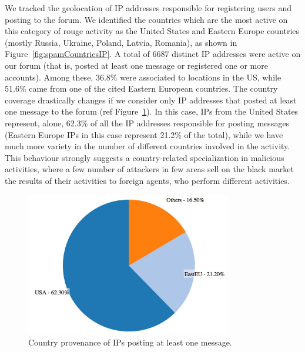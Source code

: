 We tracked the geolocation of IP addresses responsible for registering users and posting to the forum. We identified the countries which are the most active on this category of rouge activity as the United States and Eastern Europe countries (mostly Russia, Ukraine, Poland, Latvia, Romania), as shown in Figure~\ref{fig:spamCountriesIP}. A total of 6687 distinct IP addresses were active on our forum (that is, posted at least one message or registered one or more accounts). Among these, 36.8\% were associated to locations in the US, while 51.6\% came from one of the cited Eastern European countries. The country coverage drastically changes if we consider only IP addresses that posted at least one message to the forum (ref Figure~\ref{fig:spamCountriesMessage}). In this case, IPs from the United States represent, alone, 62.3\% of all the IP addresses responsible for posting messages (Eastern Europe IPs in this case represent 21.2\% of the total), while we have much more variety in the number of different countries involved in the activity. This behaviour strongly suggests a country-related specialization in malicious activities, where a few number of attackers in few areas sell on the black market the results of their activities to foreign agents, who perform different activities.

\begin{figure}[tbh]
\centerline{\includegraphics[width=0.8\textwidth]{Images/spamCountriesMessage.jpg}}
\caption{Country provenance of IPs posting at least one message.\label{fig:spamCountriesMessage}}
\end{figure}

